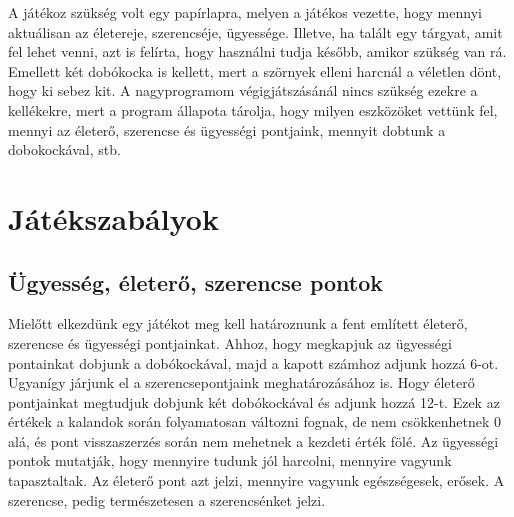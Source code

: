 \documentclass[12pt,a4paper,oneside]{report}
\begin{document}
  A játékoz szükség volt egy papírlapra, melyen a játékos vezette, hogy
  mennyi aktuálisan az életereje, szerencséje, ügyessége. Illetve, ha
  talált egy tárgyat, amit fel lehet venni, azt is felírta, hogy
  használni tudja később, amikor szükség van rá. Emellett két dobókocka
  is kellett, mert a szörnyek elleni harcnál a véletlen dönt, hogy ki
  sebez kit. A nagyprogramom végigjátszásánál nincs szükség ezekre a
  kellékekre, mert a program állapota tárolja, hogy milyen eszközöket vettünk
  fel, mennyi az életerő, szerencse és ügyességi pontjaink, mennyit
  dobtunk a dobokockával, stb.
  

    \section{Játékszabályok}
  
      \subsection{Ügyesség, életerő, szerencse pontok}
        Mielőtt elkezdünk egy játékot meg kell határoznunk a fent említett
        életerő, szerencse és ügyességi pontjainkat. Ahhoz, hogy megkapjuk az
        ügyességi pontainkat dobjunk a dobókockával, majd a kapott számhoz
        adjunk hozzá 6-ot. Ugyanígy járjunk el a szerencsepontjaink
        meghatározásához is. Hogy életerő pontjainkat megtudjuk dobjunk két
        dobókockával és adjunk hozzá 12-t. Ezek az értékek a kalandok során
        folyamatosan változni fognak, de nem csökkenhetnek 0 alá, és pont
        visszaszerzés során nem mehetnek a kezdeti érték fölé. Az ügyességi
        pontok mutatják, hogy mennyire tudunk jól harcolni, mennyire vagyunk
        tapasztaltak. Az életerő pont azt jelzi, mennyire vagyunk
        egészségesek, erősek. A szerencse, pedig természetesen a szerencsénket
        jelzi.
    
\end{document}
